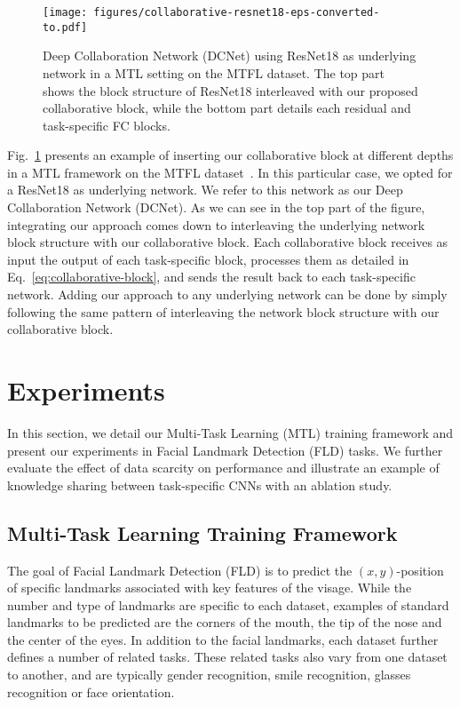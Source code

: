 \documentclass[runningheads]{llncs}
\newcommand{\citep}{\cite}
\begin{document}
\begin{figure}[t]
    \centering
    \texttt{[image: figures/collaborative-resnet18-eps-converted-to.pdf]}
    \caption{Deep Collaboration Network (DCNet) using ResNet18 as underlying network in a MTL setting on the MTFL dataset. The top part shows the block structure of ResNet18 interleaved with our proposed collaborative block, while the bottom part details each residual and task-specific FC blocks.}
    \label{fig:collaborative-resnet18}
\end{figure}

Fig.~\ref{fig:collaborative-resnet18} presents an example of inserting our collaborative block at different depths in a MTL framework on the MTFL dataset~\citep{zhang2014facial}. In this particular case, we opted for a ResNet18 as underlying network. We refer to this network as our Deep Collaboration Network (DCNet). As we can see in the top part of the figure, integrating our approach comes down to interleaving the underlying network block structure with our collaborative block. Each collaborative block receives as input the output of each task-specific block, processes them as detailed in Eq.~\eqref{eq:collaborative-block}, and sends the result back to each task-specific network. Adding our approach to any underlying network can be done by simply following the same pattern of interleaving the network block structure with our collaborative block.



\section{Experiments}
\label{sec:experiments}

In this section, we detail our Multi-Task Learning (MTL) training framework and present our experiments in Facial Landmark Detection (FLD) tasks. We further evaluate the effect of data scarcity on performance and illustrate an example of knowledge sharing between task-specific CNNs with an ablation study.

\subsection{Multi-Task Learning Training Framework}
\label{ssec:mtl-framework}

The goal of Facial Landmark Detection (FLD) is to predict the $(x,y)$-position of specific landmarks associated with key features of the visage. While the number and type of landmarks are specific to each dataset, examples of standard landmarks to be predicted are the corners of the mouth, the tip of the nose and the center of the eyes. In addition to the facial landmarks, each dataset further defines a number of related tasks. These related tasks also vary from one dataset to another, and are typically gender recognition, smile recognition, glasses recognition or face orientation.
\end{document}
